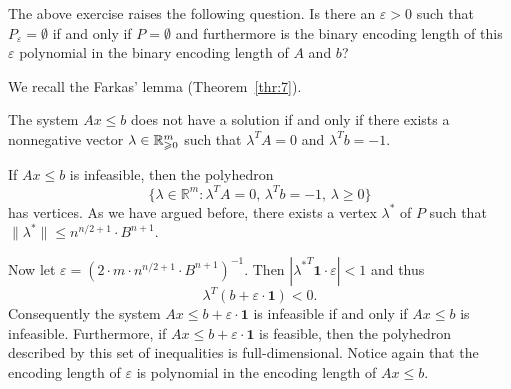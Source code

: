 The above exercise raises the following question.  Is there an $\varepsilon>0$
such that $P_\varepsilon = \emptyset$ if and only if $P = \emptyset$ and furthermore is the
binary encoding length of this $\varepsilon$ polynomial in the binary encoding
length of $A$ and $b$? 

We recall the Farkas' lemma (Theorem~\ref{thr:7}). 
\begin{theorem}
  \label{el:thr:24}
  The system $Ax\leq b$ does not have a solution if and only if there
  exists a nonnegative vector $\lambda \in \mathbb{R}^m_{\geqslant0}$ such that $\lambda^TA = 0$
  and $\lambda^Tb=-1$. 
\end{theorem}


If $Ax ≤b$ is infeasible, then the polyhedron 
\begin{displaymath}
  \{ λ ∈ ℝ^m : λ^TA = 0, \, λ^T b = -1 , \, λ ≥0 \} 
\end{displaymath}
has vertices. As we have argued before, there exists a vertex $λ^*$ of $P$ such that $\|λ^*\| ≤ n^{n/2+1} ⋅  B^{n+1}  $. 

Now let $\varepsilon =  (2 ⋅ m ⋅ n^{n/2+1} ⋅ B^{n+1})^{-1}$. Then $|{λ^*}^T \mathbf{1} \cdot \varepsilon |<1$ and thus 
\begin{equation}
  \label{el:eq:42}
  \lambda^T (b+ \varepsilon \cdot \mathbf{1}) <0. 
\end{equation}
%
Consequently the system $Ax\leq b+\varepsilon \cdot \mathbf{1}$ 
is infeasible if and only
if $Ax\leq b$ is infeasible. Furthermore, if $Ax\leq b+\varepsilon \cdot \mathbf{1}$  is feasible, then the polyhedron described by this set of inequalities is full-dimensional. 
Notice again that the encoding length of
$\varepsilon$ is polynomial in the encoding length of $Ax\leq b$.  %



